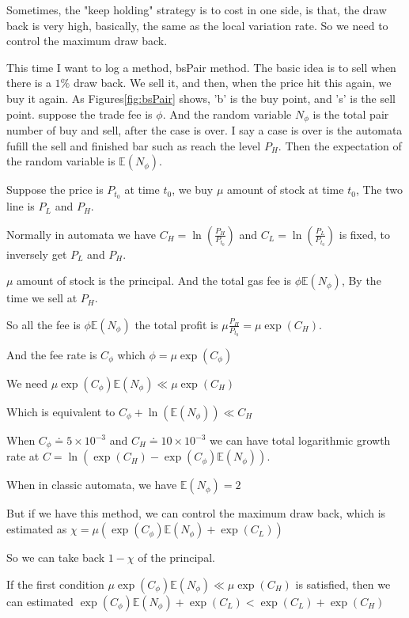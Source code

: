 \documentclass{article}
\theoremstyle{definition} %
\begin{document}
Sometimes, the "keep holding" strategy is
to cost in one side, is that, the draw
back is very high, basically, the same
as the local variation rate.
So we need to control the maximum draw back.

This time I want to log a method,
bsPair method.
The basic idea is to sell when there is a
$1\%$ draw back. We sell it, and then,
when the price hit this again, we buy it again.
As Figures\ref{fig:bsPair} shows,
'b' is the buy point, and 's' is the
sell point.
suppose the trade fee is $\phi$.
And the random variable $N_{\phi}$ is the
total pair number of buy and sell,
after the case is over.
I say a case is over is the automata fufill
the sell and finished bar such as reach the
level $P_H$.
Then the expectation of the random variable
is $\mathbb{E}(N_{\phi})$.

Suppose the price is $P_{t_0}$ at time $t_0$,
we buy $\mu$ amount of stock at time $t_0$,
The two line is $P_L$ and $P_H$.

Normally in automata we have
$C_H=\ln(\frac{P_H}{P_{t_0}})$
and
$C_L=\ln(\frac{P_L}{P_{t_0}})$
is fixed, to inversely get $P_L$ and $P_H$.

$\mu$ amount of stock is the principal.
And the total gas fee is
$\phi\mathbb{E}(N_{\phi})$,
By the time we sell at $P_H$.

So all the fee is $\phi\mathbb{E}(N_{\phi})$
the total profit is
$\mu\frac{P_H}{P_{t_0}}=\mu\exp(C_H)$.

And the fee rate is $C_\phi$
which $\phi=\mu\exp(C_\phi)$

We need
$\mu\exp(C_\phi)\mathbb{E}(N_{\phi})
    \ll
    \mu\exp(C_H)$

Which is equivalent to
$C_\phi+\ln(\mathbb{E}(N_{\phi}))
    \ll
    C_H$

When $C_\phi\doteq5\times10^{-3}$
and
$C_H\doteq10\times10^{-3}$
we can have total logarithmic growth
rate at
$C=
    \ln(
    \exp(C_H)-\exp(C_\phi)\mathbb{E}(N_{\phi}))$.

When in classic automata, we have
$\mathbb{E}(N_{\phi})=2$

But if we have this method, we can control
the maximum draw back, which is
estimated as
$\chi=
    \mu
    (\exp(C_\phi)\mathbb{E}(N_{\phi})
    +
    \exp(C_L))$

So we can take back $1-\chi$
of the principal.

If the first condition
$\mu\exp(C_\phi)\mathbb{E}(N_{\phi})
    \ll
    \mu\exp(C_H)$
is satisfied, then we can
estimated
$\exp(C_\phi)\mathbb{E}(N_{\phi})
    +
    \exp(C_L)<\exp(C_L)+\exp(C_H)$
\end{document}
